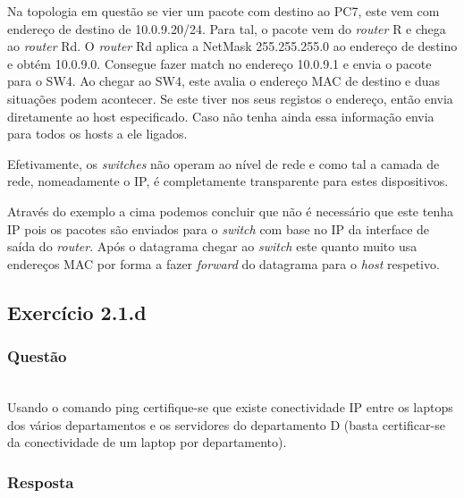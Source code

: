 \documentclass{llncs}
\begin{document}
Na topologia em questão se vier um pacote com destino ao PC7, este vem com endereço de destino de 10.0.9.20/24. Para tal, o pacote vem do \textit{router} R e chega ao \textit{router} Rd. O \textit{router} Rd aplica a NetMask 255.255.255.0 ao endereço de destino e obtém 10.0.9.0. Consegue fazer match no endereço 10.0.9.1 e envia o pacote para o SW4. Ao chegar ao SW4, este avalia o endereço MAC de destino e duas situações podem acontecer. Se este tiver nos seus registos o endereço, então envia diretamente ao host especificado. Caso não tenha ainda essa informação envia para todos os hosts a ele ligados.

Efetivamente, os \textit{switches} não operam ao nível de rede e como tal a camada de rede, nomeadamente o IP, é completamente transparente para estes dispositivos.

Através do exemplo a cima podemos concluir que não é necessário que este tenha IP pois os pacotes são enviados para o \textit{switch} com base no IP da interface de saída do \textit{router}. Após o datagrama chegar ao \textit{switch} este quanto muito usa endereços MAC por forma a fazer \textit{forward} do datagrama para o \textit{host} respetivo.

\subsection{Exercício 2.1.d}
\subsubsection{Questão}\rule[-10pt]{0pt}{10pt}\\

Usando o comando ping certifique-se que existe conectividade IP entre os laptops dos vários departamentos e os servidores do departamento D (basta certificar-se da conectividade de um laptop por departamento).

\pagebreak
\subsubsection{Resposta}\rule[-10pt]{0pt}{10pt}\\
\end{document}
